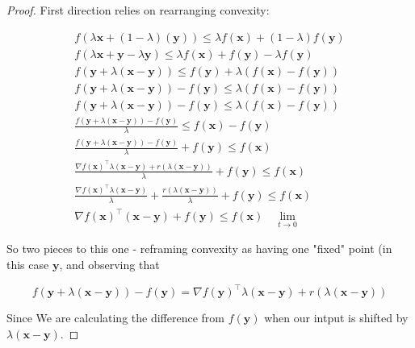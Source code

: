 \documentclass{article}
\begin{document}
		\begin{proof}
			First direction relies on rearranging convexity:
			
			\begin{align*}
				f(\lambda \mathbf{x} + (1-\lambda)(\mathbf{y})) \le \lambda f(\mathbf{x}) + (1-\lambda)f(\mathbf{y}) \\
				f(\lambda \mathbf{x} + \mathbf{y}-\lambda\mathbf{y}) \le \lambda f(\mathbf{x}) + f(\mathbf{y}) -\lambda f(\mathbf{y}) \\
				f( \mathbf{y} + \lambda(\mathbf{x-y})) \le f(\mathbf{y}) + \lambda (f(\mathbf{x}) - f(\mathbf{y})) \\
				f( \mathbf{y} + \lambda(\mathbf{x-y})) -  f(\mathbf{y}) \le  \lambda (f(\mathbf{x}) - f(\mathbf{y})) \\
				f( \mathbf{y} + \lambda(\mathbf{x-y})) -  f(\mathbf{y}) \le  \lambda (f(\mathbf{x}) - f(\mathbf{y})) \\
				\frac{f( \mathbf{y} + \lambda(\mathbf{x-y})) -  f(\mathbf{y})}{\lambda} \le f(\mathbf{x}) - f(\mathbf{y}) \\
				\frac{f( \mathbf{y} + \lambda(\mathbf{x-y})) -  f(\mathbf{y})}{\lambda} + f(\mathbf{y}) \le f(\mathbf{x})  \\
				\frac{\nabla f(\mathbf{x})^\top \lambda(\mathbf{x-y}) + r(\lambda(\mathbf{x-y})) }{\lambda} + f(\mathbf{y}) \le f(\mathbf{x}) \\
				\frac{\nabla f(\mathbf{x})^\top \lambda(\mathbf{x-y})}{\lambda} + \frac{r(\lambda(\mathbf{x-y})) }{\lambda} + f(\mathbf{y}) \le f(\mathbf{x}) \\
				{\nabla f(\mathbf{x})^\top (\mathbf{x-y})} + f(\mathbf{y}) \le f(\mathbf{x})\quad\lim_{t\to 0}
			\end{align*}
			
			So two pieces to this one - reframing convexity as having one "fixed" point (in this case $\mathbf{y}$, and observing that 
			
			\[ f( \mathbf{y} + \lambda(\mathbf{x-y})) -  f(\mathbf{y}) = \nabla f(\mathbf{y})^\top \lambda(\mathbf{x-y}) + r(\lambda(\mathbf{x-y}))  \]
			
			Since We are calculating the difference from $f(\mathbf{y})$ when our intput is shifted by $\lambda(\mathbf{x-y})$.
		\end{proof}
		
\end{document}
